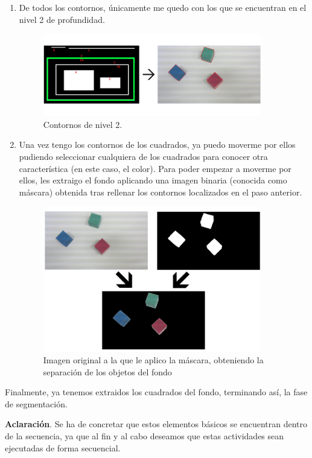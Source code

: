 \documentclass[11pt]{article}
\begin{document}
\begin{enumerate}
\item De todos los contornos, únicamente me quedo con los que se encuentran en el nivel 2 de profundidad.
\begin{figure}[h!]
  \centering
      \includegraphics[width=0.9\textwidth]{img10}
  \caption{Contornos de nivel 2.}
\end{figure}

\item Una vez tengo los contornos de los cuadrados, ya puedo moverme por ellos pudiendo seleccionar cualquiera de los cuadrados para conocer otra característica (en este caso, el color). Para poder empezar a moverme por ellos, les extraigo el fondo aplicando una imagen binaria (conocida como máscara) obtenida tras rellenar los contornos localizados en el paso anterior.
\begin{figure}[h!]
  \centering
      \includegraphics[width=0.9\textwidth]{img11}
  \caption{Imagen original a la que le aplico la máscara, obteniendo la separación de los objetos del fondo}
\end{figure}


\end{enumerate}
Finalmente, ya tenemos extraidos los cuadrados del fondo, terminando así, la fase de segmentación.

\begin{shaded}
\textbf{Aclaración}. Se ha de concretar que estos elementos básicos se encuentran dentro de la secuencia, ya que al fin y al cabo deseamos que estas actividades sean ejecutadas de forma secuencial.
\end{shaded}
\end{document}
